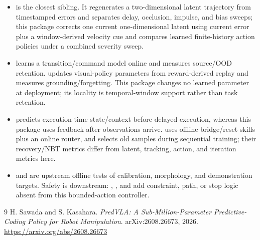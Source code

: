 \documentclass[11pt]{article}
\begin{document}
\begin{itemize}[leftmargin=1.5em]
  \item {} is the closest sibling. It regenerates a two-dimensional latent trajectory from timestamped errors and separates delay, occlusion, impulse, and bias sweeps; this package corrects one current one-dimensional latent using current error plus a window-derived velocity cue and compares learned finite-history action policies under a combined severity sweep.
  \item {} learns a transition/command model online and measures source/OOD retention.  updates visual-policy parameters from reward-derived replay and measures grounding/forgetting. This package changes no learned parameter at deployment; its locality is temporal-window support rather than task retention.
  \item {} predicts execution-time state/context before delayed execution, whereas this package uses feedback after observations arrive.  uses offline bridge/reset skills plus an online router, and  selects old samples during sequential training; their recovery/NBT metrics differ from latent, tracking, action, and iteration metrics here.
  \item {} and  are upstream offline tests of calibration, morphology, and demonstration targets. Safety is downstream: , , and  add constraint, path, or stop logic absent from this bounded-action controller.
\end{itemize}

\begin{thebibliography}{9}
 H. Sawada and S. Kasahara. \emph{PredVLA: A Sub-Million-Parameter Predictive-Coding Policy for Robot Manipulation}. arXiv:2608.26673, 2026. \url{https://arxiv.org/abs/2608.26673}
\end{thebibliography}
\end{document}
